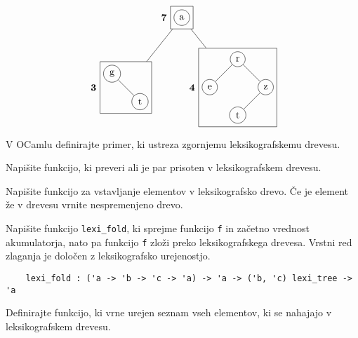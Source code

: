 \documentclass[arhiv]{../izpit}
\begin{document}
\[
  \begin{tikzpicture}[level distance=2.5cm,
    level 1/.style={sibling distance=4cm},
    level 2/.style={sibling distance=2cm}
    ]
    \node[rectangle, draw, label=left:\textbf{7}] 
        {\begin{tikzpicture}[level distance=1cm]
            \node [circle,draw] {a};
        \end{tikzpicture}}
    child {node [rectangle, draw, label=left:\textbf{3}] 
        {\begin{tikzpicture}[level distance=1cm, level 1/.style={sibling distance=1cm}]
            \node [circle,draw] {g}
                child { node [circle,draw, xshift=1cm] {t}};
        \end{tikzpicture}}
        }
    child {node [rectangle, draw, label=left:\textbf{4}] 
        {\begin{tikzpicture}[level distance=1cm, level 1/.style={sibling distance=1cm}]
            \node [circle,draw] {r}
                child { node [circle,draw] {e}}
                child { node [circle,draw] {z}
                    child {node [circle,draw, xshift=-1cm] {t}}};
        \end{tikzpicture}}
        }
    ;
  \end{tikzpicture}
\]


\podnaloga[\tocke{3}]
V OCamlu definirajte primer, ki ustreza zgornjemu leksikografskemu drevesu.

\podnaloga[\tocke{7}]
Napišite funkcijo, ki preveri ali je par prisoten v leksikografskem drevesu.

\podnaloga[\tocke{7}]
Napišite funkcijo za vstavljanje elementov v leksikografsko drevo. Če je element že v drevesu vrnite nespremenjeno drevo.

\podnaloga[\tocke{7}]
Napišite funkcijo \verb|lexi_fold|, ki sprejme funkcijo \verb|f| in začetno vrednost akumulatorja, nato pa funkcijo \verb|f| zloži preko leksikografskega drevesa. Vrstni red zlaganja je določen z leksikografsko urejenostjo.

\begin{verbatim}
    lexi_fold : ('a -> 'b -> 'c -> 'a) -> 'a -> ('b, 'c) lexi_tree -> 'a
\end{verbatim}

\podnaloga[\tocke{6}]
Definirajte funkcijo, ki vrne urejen seznam vseh elementov, ki se nahajajo v leksikografskem drevesu.


\end{document}
